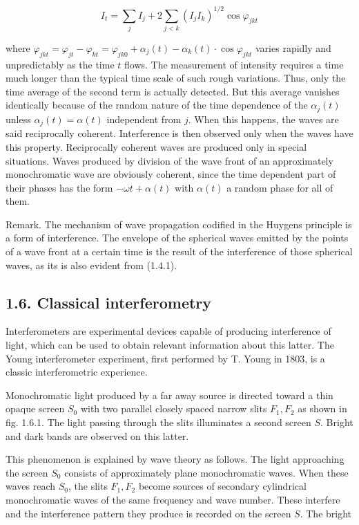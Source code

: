 \documentclass{article}
\begin{document}
\begin{equation*}
I_{t}=\sum_{j} I_{j}+2 \sum_{j<k}\left(I_{j} I_{k}\right)^{1 / 2} \cos \varphi_{j k t} \tag{1.5.9}
\end{equation*}
 
where $\varphi_{j k t}=\varphi_{j t}-\varphi_{k t}=\varphi_{j k 0}+\alpha_{j}(t)-\alpha_{k}(t) \cdot \cos \varphi_{j k t}$ varies rapidly and unpredictably as the time $t$ flows. The measurement of intensity requires a time much longer than the typical time scale of such rough variations. Thus, only the time average of the second term is actually detected. But this average vanishes identically because of the random nature of the time dependence of the $\alpha_{j}(t)$ unless $\alpha_{j}(t)=\alpha(t)$ independent from $j$. When this happens, the waves are said reciprocally coherent. Interference is then observed only when the waves have this property. Reciprocally coherent waves are produced only in special situations. Waves produced by division of the wave front of an approximately monochromatic wave are obviously coherent, since the time dependent part of their phases has the form $-\omega t+\alpha(t)$ with $\alpha(t)$ a random phase for all of them.

Remark. The mechanism of wave propagation codified in the Huygens principle is a form of interference. The envelope of the spherical waves emitted by the points of a wave front at a certain time is the result of the interference of those spherical waves, as its is also evident from (1.4.1).

\subsection*{1.6. Classical interferometry}

Interferometers are experimental devices capable of producing interference of light, which can be used to obtain relevant information about this latter. The Young interferometer experiment, first performed by T. Young in 1803, is a classic interferometric experience.

Monochromatic light produced by a far away source is directed toward a thin opaque screen $S_{0}$ with two parallel closely spaced narrow slits $F_{1}, F_{2}$ as shown in fig. 1.6.1. The light passing through the slits illuminates a second screen $S$. Bright and dark bands are observed on this latter.

This phenomenon is explained by wave theory as follows. The light approaching the screen $S_{0}$ consists of approximately plane monochromatic waves. When these waves reach $S_{0}$, the slits $F_{1}, F_{2}$ become sources of secondary cylindrical monochromatic waves of the same frequency and wave number. These interfere and the interference pattern they produce is recorded on the screen $S$. The bright
\end{document}
